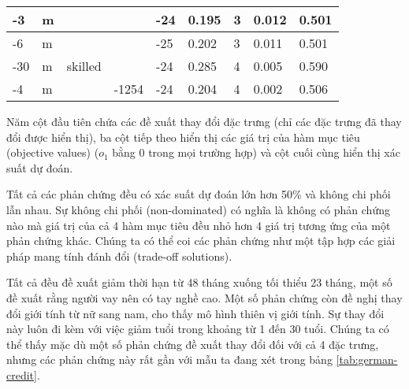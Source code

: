 \begin{table}[hbt!]
\begin{tabular}{|l|l|l|l|l|l|l|l|l|}
-3                                 & m                                 &                                   &                                      & -24                                    & 0.195                          & 3                              & 0.012                          & 0.501                          \\ \hline
-6                                 & m                                 &                                   &                                      & -25                                    & 0.202                          & 3                              & 0.011                          & 0.501                          \\ \hline
-30                                & m                                 & skilled                           &                                      & -24                                    & 0.285                          & 4                              & 0.005                          & 0.590                          \\ \hline
-4                                 & m                                 &                                   & -1254                                & -24                                    & 0.204                          & 4                              & 0.002                          & 0.506                          \\ \hline
\end{tabular}
\end{table}

Năm cột đầu tiên chứa các đề xuất thay đổi đặc trưng (chỉ các đặc trưng đã thay đổi được hiển thị), ba cột tiếp theo hiển thị các giá trị của hàm mục tiêu (objective values) ($o_1$ bằng 0 trong mọi trường hợp) và cột cuối cùng hiển thị xác suất dự đoán.

Tất cả các phản chứng đều có xác suất dự đoán lớn hơn 50\% và không chi phối lẫn nhau. Sự không chi phối (non-dominated) có nghĩa là không có phản chứng nào mà giá trị của cả 4 hàm mục tiêu đều nhỏ hơn 4 giá trị tương ứng của một phản chứng khác. Chúng ta có thể coi các phản chứng như một tập hợp các giải pháp mang tính đánh đổi (trade-off solutions).

Tất cả đều đề xuất giảm thời hạn từ 48 tháng xuống tối thiểu 23 tháng, một số đề xuất rằng người vay nên có tay nghề cao. Một số phản chứng còn đề nghị thay đổi giới tính từ nữ sang nam, cho thấy mô hình thiên vị giới tính. Sự thay đổi này luôn đi kèm với việc giảm tuổi trong khoảng từ 1 đến 30 tuổi. Chúng ta có thể thấy mặc dù một số phản chứng đề xuất thay đổi đối với cả 4 đặc trưng, nhưng các phản chứng này rất gần với mẫu ta đang xét trong bảng \ref{tab:german-credit}.


